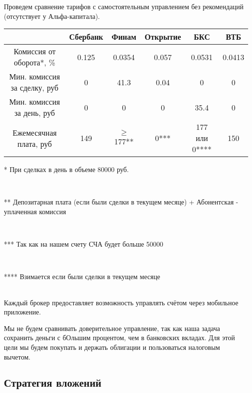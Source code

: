 Проведем сравнение тарифов с самостоятельным управлением без рекомендаций (отсутствует у Альфа-капитала).
\\
\begin{tabular}{|c|c|c|c|c|c|}
    \hline
    & Сбербанк & Финам & Открытие & БКС & ВТБ \\
    \hline
    Комиссия от оборота*, \% & 0.125 & 0.0354 & 0.057 & 0.0531 & 0.0413 \\
    \hline
    Мин. комиссия за сделку, руб & 0 & 41.3 & 0.04 & 0    & 0 \\
    \hline
    Мин. комиссия за день, руб   & 0 & 0    & 0    & 35.4 & 0 \\
    \hline
    Ежемесячная плата, руб       & 149 & $\geq$ 177** & 0*** & 177 или 0**** & 150 \\
    \hline
\end{tabular}
\begin{footnotesize}{* При сделках в день в объеме 80000 руб.}\end{footnotesize}\\
\begin{footnotesize}{** Депозитарная плата (если были сделки в текущем месяце) + Абонентская - уплаченная комиссия}\end{footnotesize}\\
\begin{footnotesize}{*** Так как на нашем счету СЧА будет больше 50000}\end{footnotesize}\\
\begin{footnotesize}{**** Взимается если были сделки в текущем месяце}\end{footnotesize}
\\

Каждый брокер предоставляет возможность управлять счётом через мобильное приложение.

Мы не будем сравнивать доверительное управление, так как наша задача сохранить деньги с бОльшим процентом, чем в банковских вкладах. Для этой цели мы будем покупать и держать облигации и пользоваться налоговым вычетом.

\subsection{Стратегия вложений}

